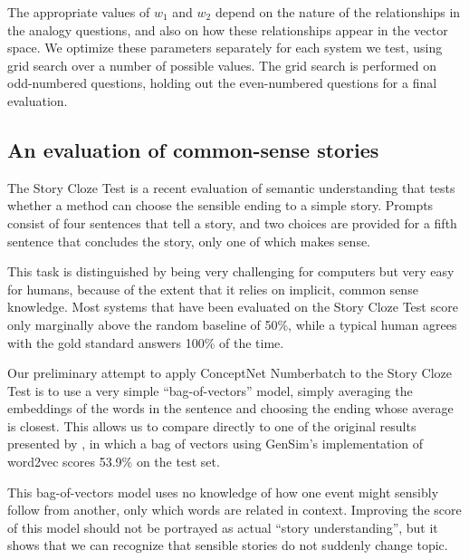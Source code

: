 \documentclass[letterpaper]{article}
\begin{document}
The appropriate values of $w_1$ and $w_2$ depend on the nature of the
relationships in the analogy questions, and also on how these relationships
appear in the vector space. We optimize these parameters separately for each
system we test, using grid search over a number of possible values. The grid
search is performed on odd-numbered questions, holding out the even-numbered
questions for a final evaluation.

\subsection{An evaluation of common-sense stories}
\label{story-evaluation}

The Story Cloze Test \cite{mostafazadeh2016cloze} is a recent evaluation of
semantic understanding that tests whether a method can choose the sensible
ending to a simple story. Prompts consist of four sentences that tell a story,
and two choices are provided for a fifth sentence that concludes the story,
only one of which makes sense.

This task is distinguished by being very challenging for computers but very
easy for humans, because of the extent that it relies on implicit, common sense
knowledge. Most systems that have been evaluated on the Story Cloze Test
score only marginally above the random baseline of 50\%, while a typical
human agrees with the gold standard answers 100\% of the time.

Our preliminary attempt to apply ConceptNet Numberbatch to the Story Cloze Test
is to use a very simple ``bag-of-vectors'' model, simply averaging the
embeddings of the words in the sentence and choosing the ending whose average is
closest. This allows us to compare directly to one of the original results presented by
\citeauthor{mostafazadeh2016cloze}, in which a bag of vectors using GenSim's
implementation of word2vec scores 53.9\% on the test set.

This bag-of-vectors model uses no knowledge of how one event might sensibly
follow from another, only which words are related in context. Improving the
score of this model should not be portrayed as actual ``story understanding'',
but it shows that we can recognize that sensible stories do not suddenly change
topic.
\end{document}
